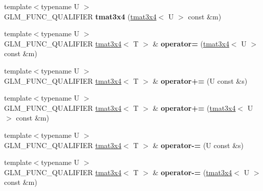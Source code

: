 \begin{DoxyCompactItemize}
\item 
\hypertarget{structglm_1_1detail_1_1tmat3x4_a80093e032a833f71909c1f1afcb983e8}{{\footnotesize template$<$typename U $>$ }\\G\-L\-M\-\_\-\-F\-U\-N\-C\-\_\-\-Q\-U\-A\-L\-I\-F\-I\-E\-R {\bfseries tmat3x4} (\hyperlink{structglm_1_1detail_1_1tmat3x4}{tmat3x4}$<$ U $>$ const \&m)}\label{structglm_1_1detail_1_1tmat3x4_a80093e032a833f71909c1f1afcb983e8}

\item 
\hypertarget{structglm_1_1detail_1_1tmat3x4_aea33b6347b51d023b31fbd9eba823352}{{\footnotesize template$<$typename U $>$ }\\G\-L\-M\-\_\-\-F\-U\-N\-C\-\_\-\-Q\-U\-A\-L\-I\-F\-I\-E\-R \hyperlink{structglm_1_1detail_1_1tmat3x4}{tmat3x4}$<$ T $>$ \& {\bfseries operator=} (\hyperlink{structglm_1_1detail_1_1tmat3x4}{tmat3x4}$<$ U $>$ const \&m)}\label{structglm_1_1detail_1_1tmat3x4_aea33b6347b51d023b31fbd9eba823352}

\item 
\hypertarget{structglm_1_1detail_1_1tmat3x4_a22f18b6c9ed1943b3ea9372eea494760}{{\footnotesize template$<$typename U $>$ }\\G\-L\-M\-\_\-\-F\-U\-N\-C\-\_\-\-Q\-U\-A\-L\-I\-F\-I\-E\-R \hyperlink{structglm_1_1detail_1_1tmat3x4}{tmat3x4}$<$ T $>$ \& {\bfseries operator+=} (U const \&s)}\label{structglm_1_1detail_1_1tmat3x4_a22f18b6c9ed1943b3ea9372eea494760}

\item 
\hypertarget{structglm_1_1detail_1_1tmat3x4_a9ea97b19c360acd8578ce5163d70650b}{{\footnotesize template$<$typename U $>$ }\\G\-L\-M\-\_\-\-F\-U\-N\-C\-\_\-\-Q\-U\-A\-L\-I\-F\-I\-E\-R \hyperlink{structglm_1_1detail_1_1tmat3x4}{tmat3x4}$<$ T $>$ \& {\bfseries operator+=} (\hyperlink{structglm_1_1detail_1_1tmat3x4}{tmat3x4}$<$ U $>$ const \&m)}\label{structglm_1_1detail_1_1tmat3x4_a9ea97b19c360acd8578ce5163d70650b}

\item 
\hypertarget{structglm_1_1detail_1_1tmat3x4_a95a1b1fd1e714017555d6b2be36018a7}{{\footnotesize template$<$typename U $>$ }\\G\-L\-M\-\_\-\-F\-U\-N\-C\-\_\-\-Q\-U\-A\-L\-I\-F\-I\-E\-R \hyperlink{structglm_1_1detail_1_1tmat3x4}{tmat3x4}$<$ T $>$ \& {\bfseries operator-\/=} (U const \&s)}\label{structglm_1_1detail_1_1tmat3x4_a95a1b1fd1e714017555d6b2be36018a7}

\item 
\hypertarget{structglm_1_1detail_1_1tmat3x4_a42ce41d4893b371e7222debdd86c3dd0}{{\footnotesize template$<$typename U $>$ }\\G\-L\-M\-\_\-\-F\-U\-N\-C\-\_\-\-Q\-U\-A\-L\-I\-F\-I\-E\-R \hyperlink{structglm_1_1detail_1_1tmat3x4}{tmat3x4}$<$ T $>$ \& {\bfseries operator-\/=} (\hyperlink{structglm_1_1detail_1_1tmat3x4}{tmat3x4}$<$ U $>$ const \&m)}\label{structglm_1_1detail_1_1tmat3x4_a42ce41d4893b371e7222debdd86c3dd0}


\end{DoxyCompactItemize}
